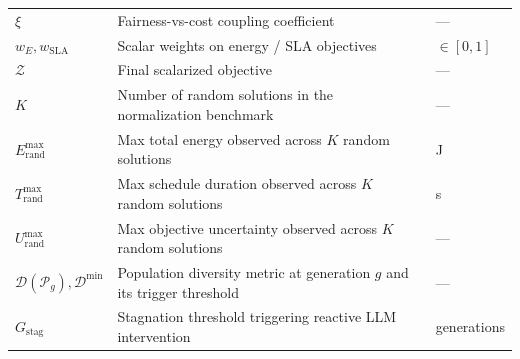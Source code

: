 \documentclass[11pt,a4paper]{article}
\begin{document}
\begin{longtable}{p{4.5cm} p{9.5cm} p{2.5cm}}
$\xi$ & Fairness-vs-cost coupling coefficient & --- \\
$w_E, w_{\text{SLA}}$ & Scalar weights on energy / SLA objectives & $\in [0,1]$ \\
$\mathcal{Z}$ & Final scalarized objective & --- \\
$K$ & Number of random solutions in the normalization benchmark & --- \\
$E^{\max}_{\text{rand}}$ & Max total energy observed across $K$ random solutions & J \\
$T^{\max}_{\text{rand}}$ & Max schedule duration observed across $K$ random solutions & s \\
$U^{\max}_{\text{rand}}$ & Max objective uncertainty observed across $K$ random solutions & --- \\
$\mathcal{D}(\mathcal{P}_g), \mathcal{D}^{\min}$ & Population diversity metric at generation $g$ and its trigger threshold & --- \\
$G_{\text{stag}}$ & Stagnation threshold triggering reactive LLM intervention & generations \\
\end{longtable}
\end{document}
